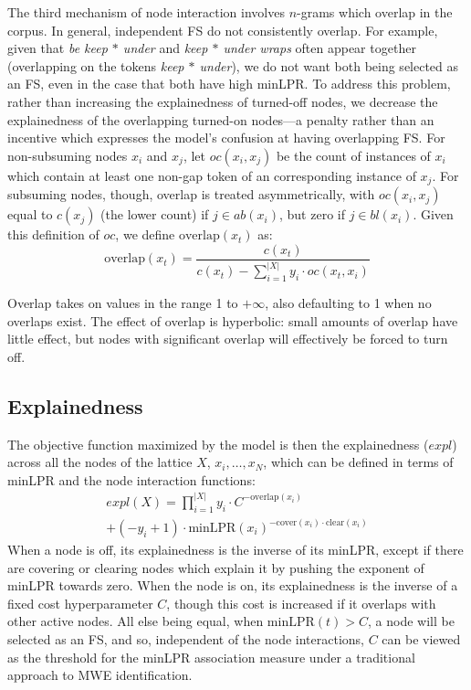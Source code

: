 \documentclass[11pt,letterpaper]{article}
\newcommand{\gap}{$*$\xspace}
\newcommand{\ex}[1]{\textit{#1}\xspace}
\newcommand{\minLPR}{\ensuremath{\text{minLPR}}}
\newcommand{\cover}{\ensuremath{\text{cover}}\xspace}
\newcommand{\clear}{\ensuremath{\text{clear}}\xspace}
\newcommand{\overlap}{\ensuremath{\text{overlap}}\xspace}
\begin{document}
The third mechanism of node interaction involves $n$-grams which overlap in the corpus. In general, independent FS do not consistently overlap. For example, given that \ex{be keep \gap under} and \ex{keep \gap under wraps} often appear together (overlapping on the tokens \ex{keep \gap under}), we do not want both being selected as an FS, even in the case that both have high minLPR. To address this problem, rather than increasing the explainedness of turned-off nodes, we decrease the explainedness of the overlapping turned-on nodes---a penalty rather than an incentive which expresses the model's confusion at having overlapping FS. For non-subsuming nodes $x_i$ and $x_j$, let $\mathit{oc}(x_i,x_j)$ be the count of instances of $x_i$ which contain at least one non-gap token of an corresponding instance of $x_j$. For subsuming nodes, though, overlap is treated asymmetrically, with $\mathit{oc}(x_i,x_j)$ equal to $c(x_j)$ (the lower count) if $j \in ab(x_i)$, but zero if $j \in bl(x_i)$.  Given this definition of $\mathit{oc}$, we define $\overlap(x_t)$ as:
\begin{displaymath}
	\overlap(x_t) = \frac{c(x_t)}{c(x_t) - \sum_{i=1}^{|X|}{y_i\cdot\mathit{oc}(x_t,x_i)}}
\end{displaymath}

Overlap takes on values in the range 1 to $+\infty$, also defaulting to 1 when no overlaps exist. The effect of overlap is hyperbolic: small amounts of overlap have little effect, but nodes with significant overlap will effectively be forced to turn off. 

\subsection{Explainedness}

The objective function maximized by the model is then the explainedness ($\mathit{expl}$) across all the nodes of the lattice $X$, $x_i,\dots,x_{N}$, which can be defined in terms of minLPR and the node interaction functions:
%
\begin{multline}
	\mathit{expl}(X) = \prod_{i=1}^{|X|}{y_i\cdot C^{-\overlap(x_i)}} \\ + (-y_i + 1)\cdot\minLPR(x_i)^{-\cover(x_i) \cdot \clear(x_i)}
\end{multline}
\noindent
When a node is off, its explainedness is the inverse of its minLPR, except if there are covering or clearing nodes which explain it by pushing the exponent of minLPR towards zero. When the node is on, its explainedness is the inverse of a fixed cost hyperparameter $C$, though this cost is increased if it overlaps with other active nodes.  All else being equal, when $\minLPR(t) > C$, a node will be selected as an FS, and so, independent of the node interactions, $C$ can be viewed as the threshold for the minLPR association measure under a traditional approach to MWE identification.
\end{document}
